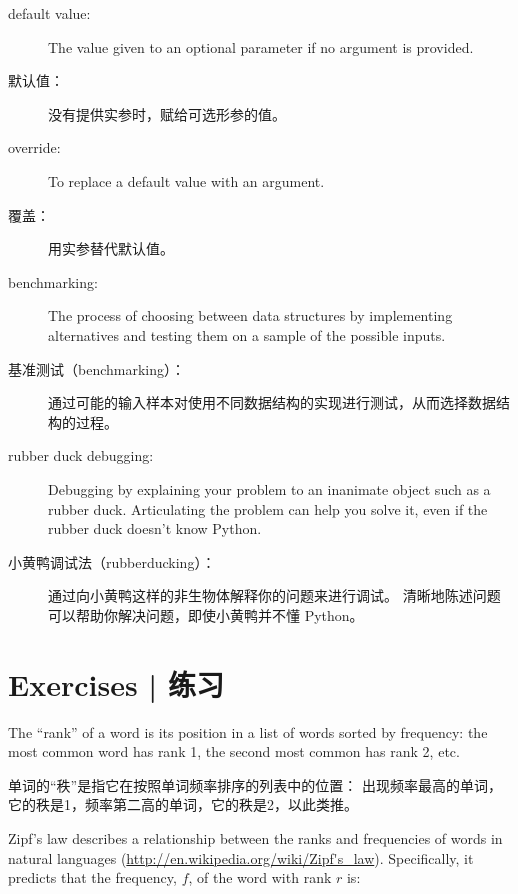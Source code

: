 {\begin{description}
\item[default value:] The value given to an optional parameter if no
argument is provided.

\item[默认值：] 没有提供实参时，赋给可选形参的值。

\item[override:] To replace a default value with an argument.

\item[覆盖：] 用实参替代默认值。

\item[benchmarking:] The process of choosing between data structures
by implementing alternatives and testing them on a sample of the
possible inputs.

\item[基准测试（benchmarking）：]通过可能的输入样本对使用不同数据结构的实现进行测试，从而选择数据结构的过程。

\item[rubber duck debugging:] Debugging by explaining your problem
to an inanimate object such as a rubber duck.  Articulating the
problem can help you solve it, even if the rubber duck doesn't know
Python.

\item[小黄鸭调试法（rubberducking）：]     通过向小黄鸭这样的非生物体解释你的问题来进行调试。
    清晰地陈述问题可以帮助你解决问题，即使小黄鸭并不懂 Python。

\end{description}

\section{Exercises  |  练习}
\begin{exercise}

The ``rank'' of a word is its position in a list of words
sorted by frequency: the most common word has rank 1, the
second most common has rank 2, etc.

单词的``秩''是指它在按照单词频率排序的列表中的位置：
出现频率最高的单词，它的秩是1，频率第二高的单词，它的秩是2，以此类推。

Zipf's law describes a relationship between the ranks and frequencies
of words in natural languages
(\url{http://en.wikipedia.org/wiki/Zipf's_law}).  Specifically, it
predicts that the frequency, $f$, of the word with rank $r$ is:


\end{exercise}}
